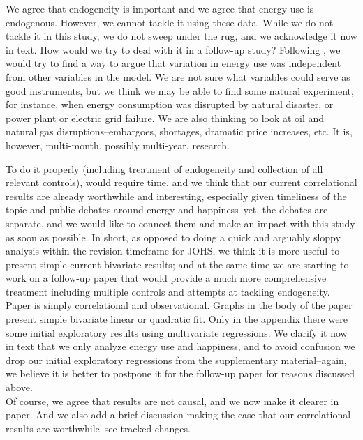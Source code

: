 
We agree that endogeneity is important and we agree that energy use is
endogenous. However, we cannot tackle it using these data. While we do not
tackle it in this study, we do not sweep under the rug, and we acknowledge it
now in text.  How would we try to deal with it in a follow-up study?
 Following \citep{sorensen12}, we would
 try to find a way to argue that variation in energy use was independent from
 other variables in the model. We are not sure what variables could serve as
 good 
 instruments, but we think we may be able to find some natural experiment, for
 instance, when energy consumption was disrupted by natural disaster, or power
 plant or electric grid failure. We are also thinking to look at oil and natural gas disruptions--embargoes, shortages, dramatic price increases, etc. It is,  however, multi-month, possibly multi-year, research. 

To do it properly (including treatment of endogeneity and collection of all
relevant controls), would require
time, and we think that our current correlational results are already worthwhile
and interesting, especially given timeliness of the topic and public debates
around energy and happiness--yet, the debates are separate, and we would like to
 connect them and make an impact with this study as soon as possible. In short, as opposed to
doing a quick and arguably sloppy analysis within the revision timeframe for
JOHS, we think it is more useful to present simple current
bivariate results; and at the same time we are starting to work on a follow-up
paper that would provide a much more comprehensive treatment including multiple
controls and attempts at tackling endogeneity.\\ 

Paper is simply correlational and observational. Graphs in the body of the paper
present simple bivariate linear or quadratic fit. Only in the appendix there were some initial exploratory results using
multivariate regressions. We clarify it now in text that we only analyze energy
use and happiness, and to avoid confusion we drop our initial exploratory regressions from the supplementary material--again, we believe it is better
to postpone it for the follow-up paper for reasons discussed above.
\\

Of course, we agree that results are not causal, and we now make it clearer in
paper. And we also add a brief discussion making the case that our
correlational results are worthwhile--see tracked changes.
\\

